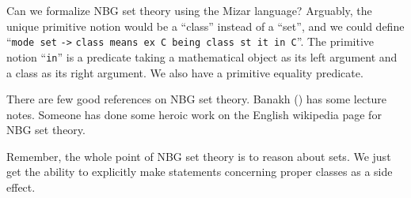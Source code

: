 \begin{puzzle}
Can we formalize NBG set theory using the Mizar language? Arguably, the
unique primitive notion would be a ``class'' instead of a ``set'', and
we could define ``\texttt{mode set} \verb|->| \texttt{class means ex C
  being class st it in C}''. The primitive notion ``\texttt{in}'' is a
predicate taking a mathematical object as its left argument and a class
as its right argument. We also have a primitive equality predicate.

\begin{node}[References]
There are few good references on NBG set theory. Banakh
() has some lecture notes. Someone has done some
heroic work on the English wikipedia page for NBG set theory.
\end{node}
\begin{node}
Remember, the whole point of NBG set theory is to reason about sets. We
just get the ability to explicitly make statements concerning proper
classes as a side effect.
\end{node}
\end{puzzle}
